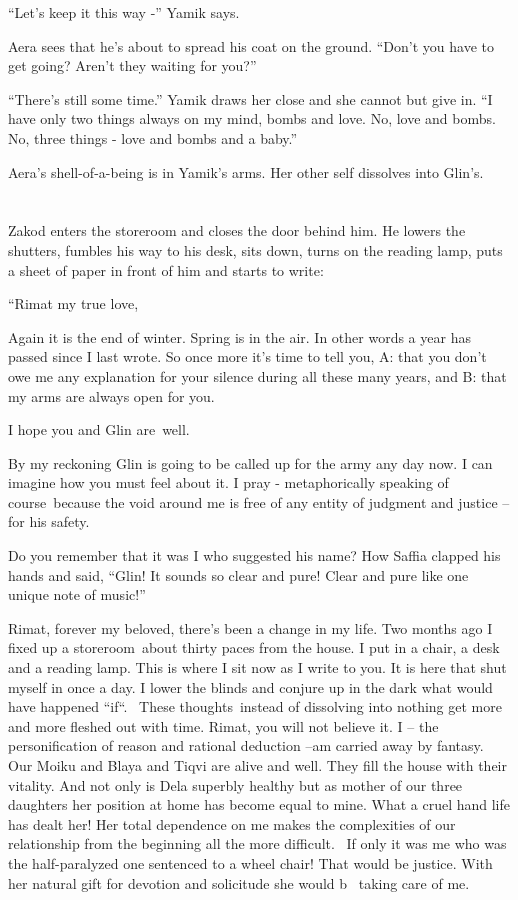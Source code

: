 \documentclass[twoside,11pt]{book}
\begin{document}
``Let's keep it this way -'' Yamik says.

Aera sees that he's about to spread his coat on the ground. ``Don't you have to get going? Aren't they waiting for
you?''

``There's still some time.'' Yamik draws her close and she cannot but give in. ``I have only two things always on my
mind, bombs and love. No, love and bombs. No, three things - love and bombs and a baby.''

Aera's shell-of-a-being is in Yamik's arms. Her other self dissolves into Glin's.

\chapter{}

Zakod enters the storeroom and closes the door behind him. He lowers the shutters, fumbles his way to his desk, sits
down, turns on the reading lamp, puts a sheet of paper in front of him and starts to write:

{}``Rimat my true love,

Again it is the end of winter. Spring is in the air. In other words a year has passed since I last wrote. So once more
it's time to tell you, A: that you don't owe me any explanation for your silence during all these many years, and B:
that my arms are always open for you.

I hope you and Glin are~well.

By my reckoning Glin is going to be called up for the army any day now. I can imagine how you must feel about it. I pray
- metaphorically speaking of course~because the void around me is free of any entity of judgment and justice -- for his
safety.

Do you remember that it was I who suggested his name? How Saffia clapped his hands and said, ``Glin! It
sounds so clear and pure! Clear and pure like one unique {note of music}!''

Rimat, forever my beloved, there's been a change in my life. Two months ago I fixed up a storeroom~about thirty paces
from the house. I put in a chair, a desk and a reading lamp. This is where I sit now as I write to you. It is here that
shut myself in once a day. I lower the blinds and conjure up in the dark what would have happened
``if``.~ These thoughts~instead of dissolving into nothing get more and more fleshed out with
time. Rimat, you will not believe it. I -- the personification of reason and rational deduction --am carried away by
fantasy.~ Our Moiku and Blaya and Tiqvi are alive and well. They fill the house with their vitality. And not only is
Dela superbly healthy but as mother of our three daughters her position at home has become equal to mine. What a cruel
hand life has dealt her! Her total dependence on me makes the complexities of our relationship from the beginning all
the more difficult. \ If only it was me who was the half-paralyzed one sentenced to a wheel chair! That would be
justice. With her natural gift for devotion and solicitude she would b \ taking care of me.~
\end{document}
